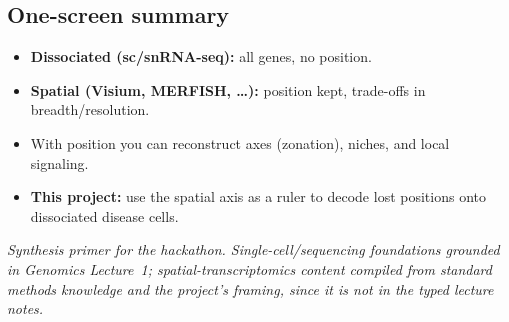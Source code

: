 \documentclass[11pt]{article}
\begin{document}

\subsection*{One-screen summary}
\begin{itemize}[leftmargin=1.4em]
  \item \textbf{Dissociated (sc/snRNA-seq):} all genes, no position.
  \item \textbf{Spatial (Visium, MERFISH, \ldots):} position kept, trade-offs in breadth/resolution.
  \item With position you can reconstruct axes (zonation), niches, and local signaling.
  \item \textbf{This project:} use the spatial axis as a ruler to decode lost positions onto dissociated disease
        cells.
\end{itemize}

\bigskip
\noindent\textit{\small Synthesis primer for the hackathon. Single-cell/sequencing foundations grounded in Genomics
Lecture~1; spatial-transcriptomics content compiled from standard methods knowledge and the project's framing, since
it is not in the typed lecture notes.}
\end{document}

